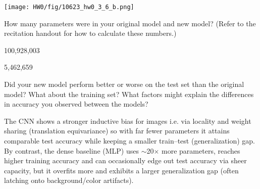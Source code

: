 \documentclass[11pt,addpoints,answers]{exam}
\begin{document}
\begin{questions}
\begin{parts}
\begin{subparts}
        \begin{answer_box}[title=,height=9cm, width=15cm]
        \centering
        \texttt{[image: HW0/fig/10623\_hw0\_3\_6\_b.png]}
        \end{answer_box}

    \subpart[2] How many parameters were in your original model and new model? (Refer to the recitation handout for how to calculate these numbers.)

        \begin{answer_box}[title=Original model,height=2cm, width=4cm]
        100,928,003
        \end{answer_box}
        
        \begin{answer_box}[title=New model,height=2cm, width=4cm]
        5,462,659
        \end{answer_box}

\clearpage

    \subpart[2] Did your new model perform better or worse on the test set than the original model? What about the training set? What factors might explain the differences in accuracy you observed between the models?

        \begin{answer_box}[title=,height=8cm, width=15cm]
        The CNN shows a stronger inductive bias for images i.e. via locality and weight sharing (translation equivariance) so with far fewer parameters it attains comparable test accuracy while keeping a smaller train–test (generalization) gap. By contrast, the dense baseline (MLP) uses $\sim$20$\times$ more parameters, reaches higher training accuracy and can occasionally edge out test accuracy via sheer capacity, but it overfits more and exhibits a larger generalization gap (often latching onto background/color artifacts).

        \end{answer_box}

\end{subparts}

\end{parts}

\clearpage


\end{questions}
\end{document}
